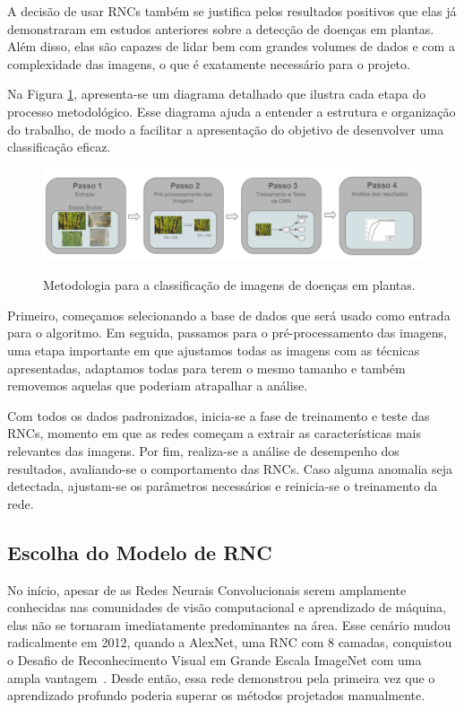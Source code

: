 A decisão de usar \ac{RNC}s também se justifica pelos resultados positivos que elas já demonstraram em estudos anteriores sobre a detecção de doenças em plantas. Além disso, elas são capazes de lidar bem com grandes volumes de dados e com a complexidade das imagens, o que é exatamente necessário para o projeto.

Na Figura \ref{Fig:RezendeMet}, apresenta-se um diagrama detalhado que ilustra cada etapa do processo metodológico. Esse diagrama ajuda a entender a estrutura e organização do trabalho, de modo a facilitar a apresentação do objetivo de desenvolver uma classificação eficaz.

\begin{figure}[!h]
	\centering
	\caption{Metodologia para a classificação de imagens de doenças em plantas.}
	\includegraphics[width=15cm]{figuras/RezendeMetodos.png}\\
	\label{Fig:RezendeMet}
\end{figure}

Primeiro, começamos selecionando a base de dados que será usado como entrada para o algoritmo. Em seguida, passamos para o pré-processamento das imagens, uma etapa importante em que ajustamos todas as imagens com as técnicas apresentadas, adaptamos todas para terem o mesmo tamanho e também removemos aquelas que poderiam atrapalhar a análise.

Com todos os dados padronizados, inicia-se a fase de treinamento e teste das RNCs, momento em que as redes começam a extrair as características mais relevantes das imagens. Por fim, realiza-se a análise de desempenho dos resultados, avaliando-se o comportamento das RNCs. Caso alguma anomalia seja detectada, ajustam-se os parâmetros necessários e reinicia-se o treinamento da rede.

\subsection{Escolha do Modelo de \ac{RNC}}
No início, apesar de as Redes Neurais Convolucionais serem amplamente conhecidas nas comunidades de visão computacional e aprendizado de máquina, elas não se tornaram imediatamente predominantes na área. Esse cenário mudou radicalmente em 2012, quando a AlexNet, uma \ac{RNC} com 8 camadas, conquistou o Desafio de Reconhecimento Visual em Grande Escala ImageNet com uma ampla vantagem~\cite{Art4}. Desde então, essa rede demonstrou pela primeira vez que o aprendizado profundo poderia superar os métodos projetados manualmente.

